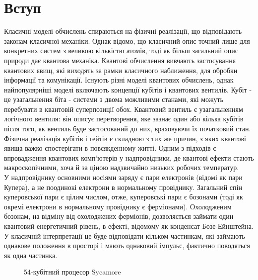 \documentclass[a4paper,14pt]{extreport}
\begin{document}
\newpage

\chapter{Вступ}\par
Класичні моделі обчислень спираються на фізичні реалізації, що відповідають законам класичної механіки.  Однак відомо, що класичний опис точний лише для конкретних систем з великою кількістю атомів, тоді як більш загальний опис природи дає квантова механіка. Квантові обчислення вивчають застосування квантових явищ, які виходять за рамки класичного наближення, для обробки інформації та комунікації. Існують різні моделі квантових обчислень, однак найпопулярніші моделі включають концепції кубітів і квантових вентилів. Кубіт - це узагальнення біта - системи з двома можливими станами, які можуть перебувати в квантовій суперпозиції обох. Квантовий вентиль є узагальненням логічного вентиля: він описує перетворення, яке зазнає один або кілька кубітів після того, як вентиль буде застосований до них, враховуючи їх початковий стан. Фізична реалізація кубітів і гейтів є складною з тих же причин, з яких квантові явища важко спостерігати в повсякденному житті. Одним з підходів є впровадження квантових комп’ютерів у надпровідники, де квантові ефекти стають макроскопічними, хоча й за ціною надзвичайно низьких робочих температур.\\

У надпровіднику основними носіями заряду є пари електронів (відомі як пари Купера), а не поодинокі електрони в нормальному провіднику. Загальний спін куперовської пари є цілим числом, отже, куперовські пари є бозонами (тоді як окремі електрони в нормальному провіднику є ферміонами). Охолодженим бозонам, на відміну від охолоджених ферміонів, дозволяється займати один квантовий енергетичний рівень, в ефекті, відомому як конденсат Бозе-Ейнштейна. У класичній інтерпретації це буде відповідати кільком частинкам, які займають однакове положення в просторі і мають однаковий імпульс, фактично поводяться як одна частинка.\\ 
\begin{figure}[h!]
\caption{54-кубітний процесор Sycamore}
  
\end{figure}
\end{document}
